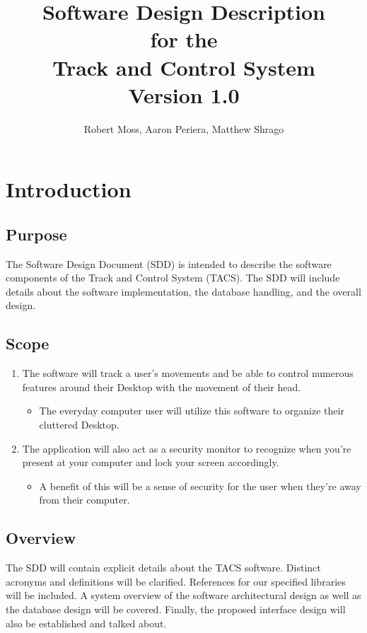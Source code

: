 \documentclass[titlepage]{article}
\begin{document}
\title{
\textbf{
Software Design Description}
\protect\\
for the
\protect\\
\textbf{
Track and Control System}
\protect\\
{\small Version 1.0}}

\author{Robert Moss, Aaron Periera, Matthew Shrago}
\maketitle

\newpage
\tableofcontents{} 
\newpage

\section{Introduction}

\subsection{Purpose}
The Software Design Document (SDD) is intended to describe the software components of the Track and Control System (TACS). The SDD will include details about the software implementation, the database handling, and the overall design. 

\subsection{Scope}
\begin{enumerate}
	\item The software will track a user's movements and be able to control numerous features around their Desktop with the movement of their head.
	\begin{itemize}	 	 	
  	\item The everyday computer user will utilize this software to organize their cluttered Desktop.  	
	\end{itemize}
  	\item The application will also act as a security monitor to recognize when you're present at your computer and lock your screen accordingly.
  	\begin{itemize}
  		\item A benefit of this will be a sense of security for the user when they're away from their computer.
  	\end{itemize}
  \end{enumerate} 

\subsection{Overview}
The SDD will contain explicit details about the TACS software. Distinct acronyms and definitions will be clarified. References for our specified libraries will be included. A system overview of the software architectural design as well as the database design will be covered. Finally, the proposed interface design will also be established and talked about. 
\end{document}
